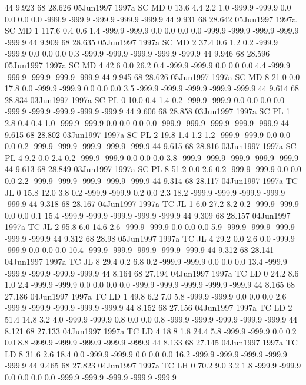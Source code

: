 44 9.923	68 28.626	05Jun1997	1997a	SC	MD	0	13.6	4.4	2.2	1.0	-999.9	-999.9	0.0	0.0	0.0	0.0	-999.9	-999.9	-999.9	-999.9	-999.9
44 9.931	68 28.642	05Jun1997	1997a	SC	MD	1	117.6	0.4	0.6	1.4	-999.9	-999.9	0.0	0.0	0.0	0.0	-999.9	-999.9	-999.9	-999.9	-999.9
44 9.909	68 28.635	05Jun1997	1997a	SC	MD	2	37.4	0.6	1.2	0.2	-999.9	-999.9	0.0	0.0	0.0	0.3	-999.9	-999.9	-999.9	-999.9	-999.9
44 9.946	68 28.596	05Jun1997	1997a	SC	MD	4	42.6	0.0	26.2	0.4	-999.9	-999.9	0.0	0.0	0.0	4.4	-999.9	-999.9	-999.9	-999.9	-999.9
44 9.945	68 28.626	05Jun1997	1997a	SC	MD	8	21.0	0.0	17.8	0.0	-999.9	-999.9	0.0	0.0	0.0	3.5	-999.9	-999.9	-999.9	-999.9	-999.9
44 9.614	68 28.834	03Jun1997	1997a	SC	PL	0	10.0	0.4	1.4	0.2	-999.9	-999.9	0.0	0.0	0.0	0.0	-999.9	-999.9	-999.9	-999.9	-999.9
44 9.606	68 28.858	03Jun1997	1997a	SC	PL	1	2.8	0.4	0.4	1.0	-999.9	-999.9	0.0	0.0	0.0	0.0	-999.9	-999.9	-999.9	-999.9	-999.9
44 9.615	68 28.802	03Jun1997	1997a	SC	PL	2	19.8	1.4	1.2	1.2	-999.9	-999.9	0.0	0.0	0.0	0.2	-999.9	-999.9	-999.9	-999.9	-999.9
44 9.615	68 28.816	03Jun1997	1997a	SC	PL	4	9.2	0.0	2.4	0.2	-999.9	-999.9	0.0	0.0	0.0	3.8	-999.9	-999.9	-999.9	-999.9	-999.9
44 9.613	68 28.849	03Jun1997	1997a	SC	PL	8	51.2	0.0	2.6	0.2	-999.9	-999.9	0.0	0.0	0.0	2.2	-999.9	-999.9	-999.9	-999.9	-999.9
44 9.314	68 28.117	04Jun1997	1997a	TC	JL	0	15.8	12.0	3.8	0.2	-999.9	-999.9	0.2	0.0	2.3	18.2	-999.9	-999.9	-999.9	-999.9	-999.9
44 9.318	68 28.167	04Jun1997	1997a	TC	JL	1	6.0	27.2	8.2	0.2	-999.9	-999.9	0.0	0.0	0.1	15.4	-999.9	-999.9	-999.9	-999.9	-999.9
44 9.309	68 28.157	04Jun1997	1997a	TC	JL	2	95.8	6.0	14.6	2.6	-999.9	-999.9	0.0	0.0	0.0	5.9	-999.9	-999.9	-999.9	-999.9	-999.9
44 9.312	68 28.98	05Jun1997	1997a	TC	JL	4	29.2	0.0	2.6	0.0	-999.9	-999.9	0.0	0.0	0.0	10.4	-999.9	-999.9	-999.9	-999.9	-999.9
44 9.312	68 28.141	04Jun1997	1997a	TC	JL	8	29.4	0.2	6.8	0.2	-999.9	-999.9	0.0	0.0	0.0	13.4	-999.9	-999.9	-999.9	-999.9	-999.9
44 8.164	68 27.194	04Jun1997	1997a	TC	LD	0	24.2	8.6	1.0	2.4	-999.9	-999.9	0.0	0.0	0.0	0.0	-999.9	-999.9	-999.9	-999.9	-999.9
44 8.165	68 27.186	04Jun1997	1997a	TC	LD	1	49.8	6.2	7.0	5.8	-999.9	-999.9	0.0	0.0	0.0	2.6	-999.9	-999.9	-999.9	-999.9	-999.9
44 8.152	68 27.156	04Jun1997	1997a	TC	LD	2	51.4	14.8	3.2	4.0	-999.9	-999.9	0.8	0.0	0.0	0.8	-999.9	-999.9	-999.9	-999.9	-999.9
44 8.121	68 27.133	04Jun1997	1997a	TC	LD	4	18.8	1.8	24.4	5.8	-999.9	-999.9	0.0	0.2	0.0	8.8	-999.9	-999.9	-999.9	-999.9	-999.9
44 8.133	68 27.145	04Jun1997	1997a	TC	LD	8	31.6	2.6	18.4	0.0	-999.9	-999.9	0.0	0.0	0.0	16.2	-999.9	-999.9	-999.9	-999.9	-999.9
44 9.465	68 27.823	04Jun1997	1997a	TC	LH	0	70.2	9.0	3.2	1.8	-999.9	-999.9	0.0	0.0	0.0	0.0	-999.9	-999.9	-999.9	-999.9	-999.9
